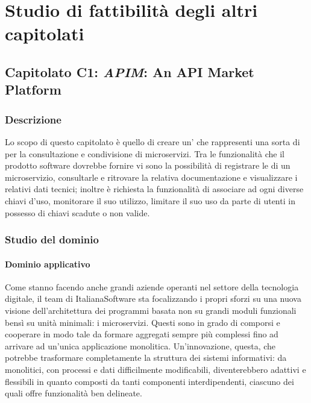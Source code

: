 \newpage

\section{Studio di fattibilità degli altri capitolati}
	\subsection{Capitolato C1: \emph{APIM}: An API Market Platform}
		\subsubsection{Descrizione}
		Lo scopo di questo capitolato è quello di creare un' che rappresenti una sorta di  per la consultazione e 
		condivisione di microservizi. Tra le funzionalità che il prodotto software dovrebbe fornire vi sono la possibilità di registrare le  
		di un microservizio, consultarle e ritrovare la relativa documentazione e visualizzare i relativi dati tecnici; inoltre è richiesta la 
		funzionalità di associare ad ogni  diverse chiavi d'uso, monitorare il suo utilizzo, limitare il suo uso da parte di utenti in possesso 
		di chiavi scadute o non valide.
		\subsubsection{Studio del dominio}
			\paragraph{Dominio applicativo}
			Come stanno facendo anche grandi aziende operanti nel settore della tecnologia digitale, il team di ItalianaSoftware sta focalizzando i propri sforzi su una nuova visione dell'architettura 
			dei programmi basata non su grandi moduli funzionali bensì su unità minimali: i microservizi. Questi sono in grado di comporsi e cooperare in modo 
			tale da formare aggregati sempre più complessi fino ad arrivare ad un'unica applicazione monolitica. Un'innovazione, questa, che potrebbe 
			trasformare completamente la struttura dei sistemi informativi: da monolitici, con processi e dati difficilmente modificabili, diventerebbero 
			adattivi e flessibili in quanto composti da tanti componenti interdipendenti, ciascuno dei quali offre funzionalità ben delineate.
